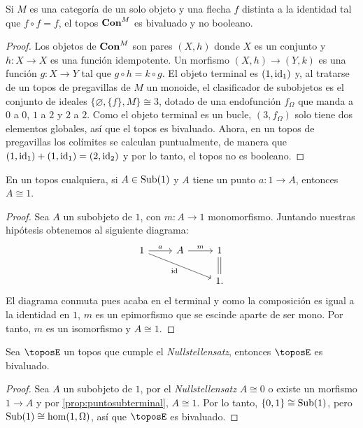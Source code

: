 \begin{proposition}
  Si $M$ es una categoría de un solo objeto y una flecha $f$ distinta a la identidad tal que 
  $f\circ f = f$, el topos $\mathbf{Con}^M$ es bivaluado y no booleano.
\end{proposition}
\begin{proof}
  Los objetos de $\mathbf{Con}^M$ son pares $(X,h)$ donde $X$ es un conjunto y $h\colon X\to X$ es 
  una función idempotente. Un morfismo $(X,h)\to (Y,k)$ es una función $g\colon X\to Y$ tal que 
  $g\circ h = k \circ g$. El objeto terminal es $(1,\operatorname{id}_1)$ y, al tratarse de un topos de pregavillas de $M$ un monoide, el 
  clasificador de subobjetos es el conjunto de ideales $\{\varnothing,\{f\},M\}\cong 3$, dotado de una endofunción $f_{\Omega}$ que manda a $0$ a $0$, $1$ a $2$ y $2$ a $2$. 
  Como el objeto terminal es un bucle, $(3,f_{\Omega})$ solo tiene dos elementos globales, así que el topos es bivaluado. 
  Ahora, en un topos de pregavillas los colímites se calculan puntualmente, de manera que $(1,\operatorname{id}_1)+(1,\operatorname{id}_1)=(2,\operatorname{id}_2)$ y
  por lo tanto, el topos no es booleano.
\end{proof}

\begin{proposition}[label=prop:puntosubterminal]
  En un topos cualquiera, si $A\in \operatorname{Sub}(1)$ y $A$ tiene un punto $a\colon 1\to A$, entonces $A \cong 1$.
\end{proposition}
\begin{proof}
  Sea $A$ un subobjeto de $1$, con $m\colon A\to 1$ monomorfismo. Juntando nuestras hipótesis obtenemos al siguiente diagrama:
  \begin{equation*}
    \begin{tikzcd}
      1\ar{r}{a}\ar[swap]{rrd}{\text{id}} & A\ar{r}{m} & 1\ar[shift left = 0.3ex, no head]{d}{}\ar[shift right = 0.3ex, no head]{d}{} \\
       & {} & 1.
    \end{tikzcd}
  \end{equation*}
  El diagrama conmuta pues acaba en el terminal y como la composición es igual a la identidad
  en $1$, $m$ es un epimorfismo que se escinde aparte de ser mono. Por tanto, $m$ es un isomorfismo y $A\cong 1$.
\end{proof}

\begin{corollary}[label=cor:nsbivaluado]
  Sea $\toposE$ un topos que cumple el \textit{Nullstellensatz}, entonces $\toposE$ es bivaluado.
\end{corollary}
\begin{proof}
  Sea $A$ un subobjeto de $1$, por el \textit{Nullstellensatz} $A\cong 0$ o existe un morfismo
  $1\to A$ y por \ref{prop:puntosubterminal}, $A\cong 1$. Por lo tanto, $\{0,1\}\cong\operatorname{Sub}(1)$, pero
  $\operatorname{Sub}(1)\cong\hom(1,\Omega)$, así que $\toposE$ es bivaluado.
\end{proof}


